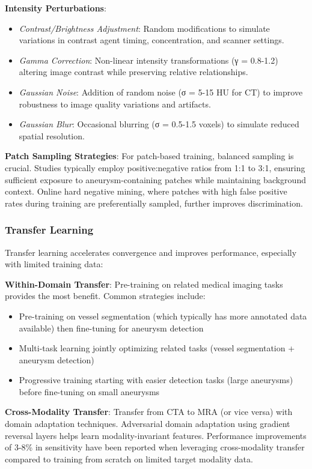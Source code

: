 \documentclass[conference]{IEEEtran}
\begin{document}
\textbf{Intensity Perturbations}:
\begin{itemize}
    \item \textit{Contrast/Brightness Adjustment}: Random modifications to simulate variations in contrast agent timing, concentration, and scanner settings.
    \item \textit{Gamma Correction}: Non-linear intensity transformations (γ = 0.8-1.2) altering image contrast while preserving relative relationships.
    \item \textit{Gaussian Noise}: Addition of random noise (σ = 5-15 HU for CT) to improve robustness to image quality variations and artifacts.
    \item \textit{Gaussian Blur}: Occasional blurring (σ = 0.5-1.5 voxels) to simulate reduced spatial resolution.
\end{itemize}

\textbf{Patch Sampling Strategies}: For patch-based training, balanced sampling is crucial. Studies typically employ positive:negative ratios from 1:1 to 3:1, ensuring sufficient exposure to aneurysm-containing patches while maintaining background context. Online hard negative mining, where patches with high false positive rates during training are preferentially sampled, further improves discrimination.

\subsubsection{Transfer Learning}
Transfer learning accelerates convergence and improves performance, especially with limited training data:

\textbf{Within-Domain Transfer}: Pre-training on related medical imaging tasks provides the most benefit. Common strategies include:
\begin{itemize}
    \item Pre-training on vessel segmentation (which typically has more annotated data available) then fine-tuning for aneurysm detection
    \item Multi-task learning jointly optimizing related tasks (vessel segmentation + aneurysm detection)
    \item Progressive training starting with easier detection tasks (large aneurysms) before fine-tuning on small aneurysms
\end{itemize}

\textbf{Cross-Modality Transfer}: Transfer from CTA to MRA (or vice versa) with domain adaptation techniques. Adversarial domain adaptation using gradient reversal layers helps learn modality-invariant features. Performance improvements of 3-8\% in sensitivity have been reported when leveraging cross-modality transfer compared to training from scratch on limited target modality data.
\end{document}
